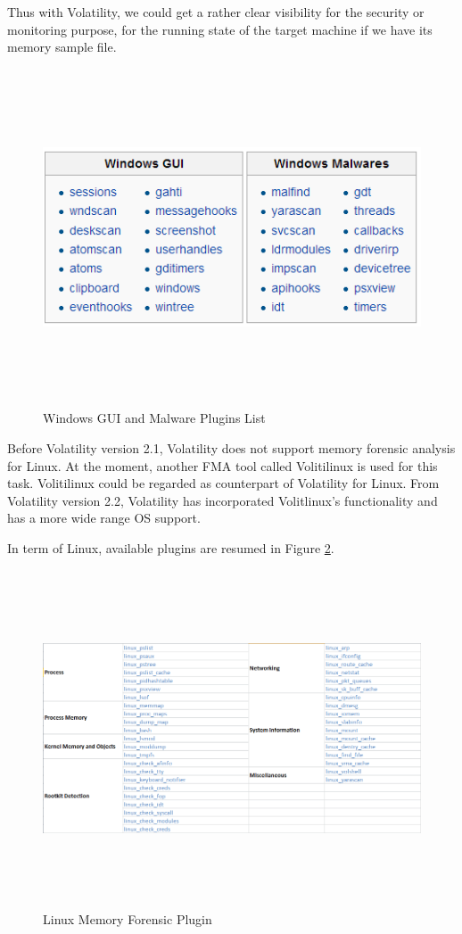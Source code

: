 Thus with Volatility, we could get a rather clear visibility for the security or monitoring purpose, for the running state of the target
machine if we have its memory sample file.

\begin{figure}[htbp]
	\centering
		\includegraphics[width=14cm, height= 10cm ]{Figures/Figure24.png}
	\caption[Windows GUI and Malware Plugins List]{Windows GUI and Malware Plugins List \cite{Reference13}}
	\label{fig:Windows GUI and Malware Plugins List}
\end{figure}

Before Volatility version 2.1, Volatility does not support memory forensic analysis for Linux. At the moment, another FMA tool called 
Volitilinux is used for this task. Volitilinux could be regarded as counterpart of Volatility for Linux. From Volatility version 2.2, 
Volatility has incorporated Volitlinux’s functionality and has a more wide range OS support.

In term of Linux, available plugins are resumed in Figure \ref{fig:Linux Memory Forensic Plugin}.
\begin{figure}[htbp]
	\centering
		\includegraphics[width=14cm, height= 10cm ]{Figures/Figure25.png}
	\caption[Linux Memory Forensic Plugin]{Linux Memory Forensic Plugin \cite{Reference36}}
	\label{fig:Linux Memory Forensic Plugin}
\end{figure}

